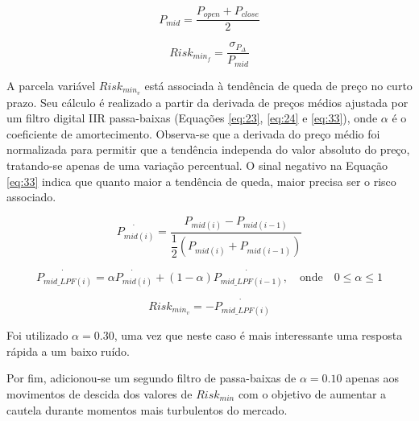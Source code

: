 \begin{itemize}
    \begin{equation} \label{eq:22}
        P_{mid} = \dfrac{P_{open} + P_{close}}{2}
    \end{equation}

    \begin{equation} \label{eq:32}
        Risk_{min_f} = \dfrac{ \sigma_{P_{\Delta}} }{ P_{mid} }
    \end{equation}

    A parcela variável \begin{math} Risk_{min_v} \end{math} está associada à tendência de queda de preço no curto prazo. Seu cálculo é realizado a partir da derivada de preços médios ajustada por um filtro digital IIR passa-baixas \cite{haykin2007signals} (Equações \ref{eq:23}, \ref{eq:24} e \ref{eq:33}), onde \begin{math} \alpha \end{math} é o coeficiente de amortecimento. Observa-se que a derivada do preço médio foi normalizada para permitir que a tendência independa do valor absoluto do preço, tratando-se apenas de uma variação percentual. O sinal negativo na Equação \ref{eq:33} indica que quanto maior a tendência de queda, maior precisa ser o risco associado.

    \begin{equation} \label{eq:23}
        \dot{P_{mid(i)}} = \dfrac{ P_{mid(i)} - P_{mid(i-1)} }{ \dfrac{1}{2}(P_{mid(i)} + P_{mid(i-1)}) }
    \end{equation}

    \begin{equation} \label{eq:24}
        \dot{P_{mid\_LPF(i)}} = \alpha \dot{P_{mid(i)}} + (1 - \alpha) \dot{P_{mid\_LPF(i-1)}},  \quad \textrm{onde} \quad 0 \le \alpha \le 1
    \end{equation}

    \begin{equation} \label{eq:33}
        Risk_{min_v} = - \dot{P_{mid\_LPF(i)}}
    \end{equation}

    Foi utilizado \begin{math} \alpha = 0.30 \end{math}, uma vez que neste caso é mais interessante uma resposta rápida a um baixo ruído.

    Por fim, adicionou-se um segundo filtro de passa-baixas de \begin{math} \alpha = 0.10 \end{math} apenas aos movimentos de descida dos valores de \begin{math} Risk_{min} \end{math} com o objetivo de aumentar a cautela durante momentos mais turbulentos do mercado.


\end{itemize}
